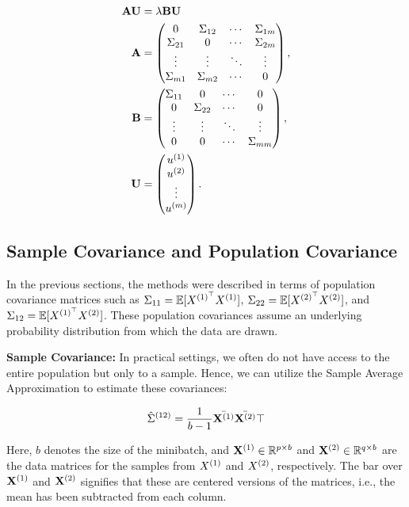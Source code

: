 \begin{align}
    \mathbf{A} \mathbf{U} &= \lambda \mathbf{B} \mathbf{U} \\
    \mathbf{A} &= \begin{pmatrix}
        0 & \Sigma_{12} & \cdots & \Sigma_{1m} \\
        \Sigma_{21} & 0 & \cdots & \Sigma_{2m} \\
        \vdots & \vdots & \ddots & \vdots \\
        \Sigma_{m1} & \Sigma_{m2} & \cdots & 0
    \end{pmatrix}, \\
    \mathbf{B} &= \begin{pmatrix}
        \Sigma_{11} & 0 & \cdots & 0 \\
        0 & \Sigma_{22} & \cdots & 0 \\
        \vdots & \vdots & \ddots & \vdots \\
        0 & 0 & \cdots & \Sigma_{mm}
    \end{pmatrix}, \\
    \mathbf{U} &= \begin{pmatrix}
        u^{(1)} \\
        u^{(2)} \\
        \vdots \\
        u^{(m)}
    \end{pmatrix}.
\end{align}

\subsection{Sample Covariance and Population Covariance}
In the previous sections, the methods were described in terms of population covariance matrices such as \(\Sigma_{11}=\mathbb{E}[X^{(1)^{\top}} X^{(1)}]\), \(\Sigma_{22}=\mathbb{E}[X^{(2)^{\top}} X^{(2)}]\), and \(\Sigma_{12}=\mathbb{E}[X^{(1)^{\top}} X^{(2)}]\). These population covariances assume an underlying probability distribution from which the data are drawn.

\textbf{Sample Covariance:} In practical settings, we often do not have access to the entire population but only to a sample. Hence, we can utilize the Sample Average Approximation to estimate these covariances:

\[
    \hat{\Sigma}^{(12)} = \frac{1}{b-1} \bar{\mathbf{X}^{(1)}} \bar{\mathbf{X}^{(2)}}\top
\]

Here, \(b\) denotes the size of the minibatch, and \(\mathbf{X}^{(1)} \in \mathbb{R}^{p \times b}\) and \(\mathbf{X}^{(2)} \in \mathbb{R}^{q \times b}\) are the data matrices for the samples from \(X^{(1)}\) and \(X^{(2)}\), respectively. The bar over \(\mathbf{X}^{(1)}\) and \(\mathbf{X}^{(2)}\) signifies that these are centered versions of the matrices, i.e., the mean has been subtracted from each column.

